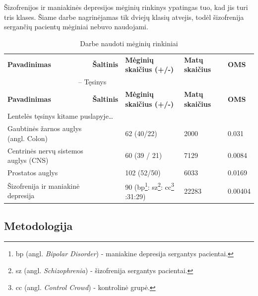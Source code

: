 Šizofrenijos ir maniakinės depresijos mėginių rinkinys ypatingas tuo, kad jis turi tris klases. Šiame darbe nagrinėjamas tik dviejų klasių atvejis, todėl šizofrenija sergančių pacientų mėginiai nebuvo naudojami.
\begin{longtable}{|p{4.5cm}|p{2cm}|p{3.5cm}|p{2.3cm}|p{2cm}|}
\captionsetup{labelsep=period}
\caption{Darbe naudoti mėginių rinkiniai\label{table:datasets}}\\
\hline \hline
{\textbf{Pavadinimas}} &
{\textbf{Šaltinis}} &
{\textbf{Mėginių skaičius (+/-)}} &
{\textbf{Matų \newline skaičius}} &
{\textbf{OMS}}\\
\hline
\endfirsthead
\multicolumn{3}{c}{{\tablename} \thetable{} -- Tęsinys} \\[0.5ex]
\hline \hline
{\textbf{Pavadinimas}} &
{\textbf{Šaltinis}} &
{\textbf{Mėginių skaičius (+/-)}}&
{\textbf{Matų \newline skaičius}} &
{\textbf{OMS}}\\
\hline
\endhead
\multicolumn{3}{l}{{Lentelės tęsinys kitame puslapyje\ldots}} \\
\endfoot
\hline \hline
\endlastfoot
\hline 
Gaubtinės žarnos auglys (angl. Colon) 
& 
\cite{alon1999broad} 
& 
62 (40/22) 
& 
2000 
& 
0.031 \\
\hline
Centrinės nervų sistemos auglys (CNS) 
& 
\cite{pomeroy2002prediction} 
& 
60 (39 / 21) 
& 
7129 
& 
0.0084 \\
\hline
Prostatos auglys 
& 
\cite{singh2002gene} 
& 
102 (52/50) 
& 
6033 
& 
0.0169 \\
\hline
Šizofrenija ir maniakinė depresija
&
\cite{altara}
&
90 \newline (bp\footnote{bp (angl. \textit{Bipolar Disorder}) - maniakine depresija sergantys pacientai.}:
sz\footnote{sz (angl. \textit{Schizophrenia}) - šizofrenija sergantys pacientai.}:
cc\footnote{cc (angl. \textit{Control Crowd}) - kontrolinė grupė.} \newline =30:31:29)
&
22283
&
0.00404 \\
\hline
\end{longtable}

\subsection{Metodologija}


